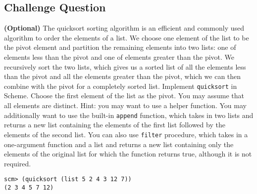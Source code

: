 \begin{blocksection}
\section{Challenge Question}
\question \textbf{(Optional)} The quicksort sorting algorithm is an efficient and commonly used algorithm to
order the elements of a list. We choose one element of the list to be the pivot
element and partition the remaining elements into two lists: one of elements less
than the pivot and one of elements greater than the pivot. We recursively sort the
two lists, which gives us a sorted list of all the elements less than the pivot and all
the elements greater than the pivot, which we can then combine with the pivot for
a completely sorted list.
\newline
\newline
Implement \texttt{quicksort} in Scheme. Choose the first element of the list
as the pivot. You may assume that all elements are distinct. Hint: you may want to use a helper function.
\newline
\newline
You may additionally want to use the built-in \texttt{append} function, which takes in two lists and returns 
a new list containing the elements of the first list followed by the elements of the second list. 
You can also use \texttt{filter} procedure, which takes in a one-argument function and a list and returns a new 
list containing only the elements of the original list for which the function returns true, although it is not required.
\newline

\begin{lstlisting}
scm> (quicksort (list 5 2 4 3 12 7))
(2 3 4 5 7 12)
\end{lstlisting}

\end{blocksection}

